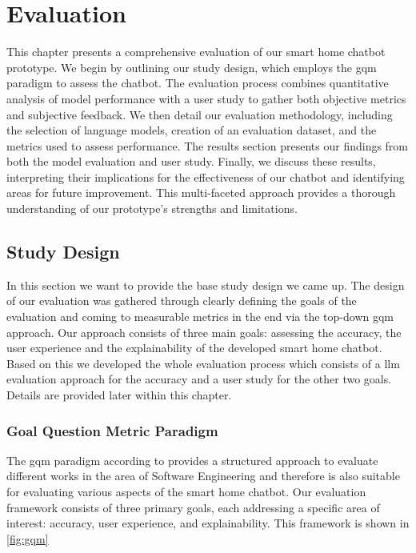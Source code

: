
\chapter{Evaluation}
\label{chap:evaluation}

This chapter presents a comprehensive evaluation of our smart home chatbot prototype. We begin by outlining our study design, which employs the \gls{gqm} paradigm to assess the chatbot. The evaluation process combines quantitative analysis of model performance with a user study to gather both objective metrics and subjective feedback. We then detail our evaluation methodology, including the selection of language models, creation of an evaluation dataset, and the metrics used to assess performance. The results section presents our findings from both the model evaluation and user study. Finally, we discuss these results, interpreting their implications for the effectiveness of our chatbot and identifying areas for future improvement. This multi-faceted approach provides a thorough understanding of our prototype's strengths and limitations.

\section{Study Design}
In this section we want to provide the base study design we came up.
The design of our evaluation was gathered through clearly defining the goals of the evaluation and coming to measurable metrics in the end via the top-down \gls{gqm} approach.
Our approach consists of three main goals: assessing the accuracy, the user experience and the explainability of the developed smart home chatbot.
Based on this we developed the whole evaluation process which consists of a \gls{llm} evaluation approach for the accuracy and a user study for the other two goals.
Details are provided later within this chapter.

\subsection{Goal Question Metric Paradigm}
The \gls{gqm} paradigm according to \citet{caldiera1994goal} provides a structured approach to evaluate different works in the area of Software Engineering and therefore is also suitable for evaluating various aspects of the smart home chatbot. 
Our evaluation framework consists of three primary goals, each addressing a specific area of interest: accuracy, user experience, and explainability.
This framework is shown in \cref{fig:gqm}

